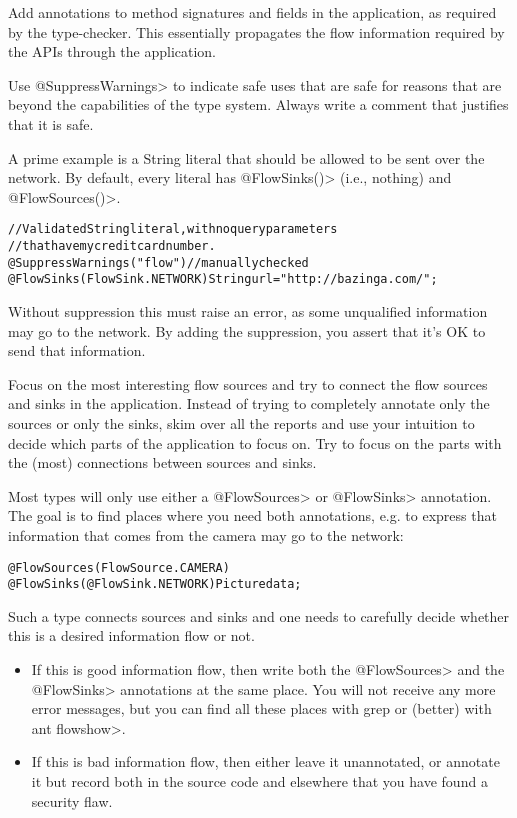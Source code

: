 Add annotations to method signatures and fields in the application, as
required by the type-checker. This essentially propagates the flow
information required by the APIs through the application.

Use \<@SuppressWarnings> to indicate safe uses that are safe for reasons
that are beyond the capabilities of the type system. Always write a
comment that justifies that it is safe.

A prime example is a String literal that should be allowed to be sent
over the network. By default, every literal has \<@FlowSinks()>
(i.e., nothing) and \<@FlowSources()>.

\begin{alltt}
    // Validated String literal, with no query parameters
    // that have my credit card number.
    @SuppressWarnings("flow") // manually checked
    @FlowSinks(FlowSink.NETWORK) String url = "http://bazinga.com/";
\end{alltt}

Without suppression this must raise an error, as some unqualified
information may go to the network. By adding the suppression, you
assert that it's OK to send that information.

Focus on the most interesting flow sources and try to connect the flow
sources and sinks in the application. Instead of trying to completely
annotate only the sources or only the sinks, skim over all the reports
and use your intuition to decide which parts of the application to
focus on. Try to focus on the parts with the (most) connections
between sources and sinks.

Most types will only use either a \<@FlowSources> or \<@FlowSinks>
annotation.
The goal is to find places where you need both annotations, e.g. to
express that information that comes from the camera may go to the
network:

\begin{alltt}
    @FlowSources(FlowSource.CAMERA)
    @FlowSinks(@FlowSink.NETWORK) Picture data;
\end{alltt}

Such a type connects sources and sinks and one needs to carefully
decide whether this is a desired information flow or not.
\begin{itemize}
\item If this is good information flow, then write both the \<@FlowSources>
  and the \<@FlowSinks> annotations at the same place. You will not
  receive any more error messages, but you can find all these places
  with grep or (better) with \<ant flowshow>.
\item If this is bad information flow, then either leave it unannotated,
  or annotate it but record both in the source code and elsewhere that
  you have found a security flaw.
\end{itemize}

